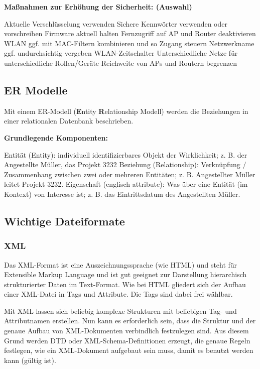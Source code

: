 \documentclass[asp1.tex]{subfiles}
\begin{document}
\textbf{Maßnahmen zur Erhöhung der Sicherheit: (Auswahl)}
\begin{outline}
    \1 Aktuelle Verschlüsselung verwenden
    \1 Sichere Kennwörter verwenden oder vorschreiben
    \1 Firmware aktuell halten
    \1 Fernzugriff auf AP und Router deaktivieren
    \1 WLAN ggf. mit MAC-Filtern kombinieren und so Zugang steuern
    \1 Netzwerkname ggf. undurchsichtig vergeben
    \1 WLAN-Zeitschalter
    \1 Unterschiedliche Netze für unterschiedliche Rollen/Geräte
    \1 Reichweite von APs und Routern begrenzen
\end{outline}

\subsection{ER Modelle}

Mit einem ER-Modell (\textbf{E}ntity \textbf{R}elationship Modell) werden die Beziehungen in einer relationalen Datenbank beschrieben.

\textbf{Grundlegende Komponenten:}
\begin{outline}
    \1 Entität (Entity): individuell identifizierbares Objekt der Wirklichkeit; z. B. der Angestellte Müller, das Projekt 3232
    \1 Beziehung (Relationship): Verknüpfung / Zusammenhang zwischen zwei oder mehreren Entitäten; z. B. Angestellter Müller leitet Projekt 3232.
    \1 Eigenschaft (englisch attribute): Was über eine Entität (im Kontext) von Interesse ist; z. B. das Eintrittsdatum des Angestellten Müller.
\end{outline}

\subsection{Wichtige Dateiformate}

\subsubsection{XML}

Das XML-Format ist eine Auszeichnungssprache (wie HTML) und steht für Extensible Markup Language und ist gut geeignet zur Darstellung hierarchisch strukturierter Daten im Text-Format. Wie bei HTML gliedert sich der Aufbau einer XML-Datei in Tags und Attribute. Die Tags sind dabei frei wählbar.

Mit XML lassen sich beliebig komplexe Strukturen mit beliebigen Tag- und Attributnamen erstellen. Nun kann es erforderlich sein, dass die Struktur und der genaue Aufbau von XML-Dokumenten verbindlich festzulegen sind. Aus diesem Grund werden DTD oder XML-Schema-Definitionen erzeugt, die genaue
Regeln festlegen, wie ein XML-Dokument aufgebaut sein muss, damit es benutzt werden kann (gültig ist).
\end{document}
